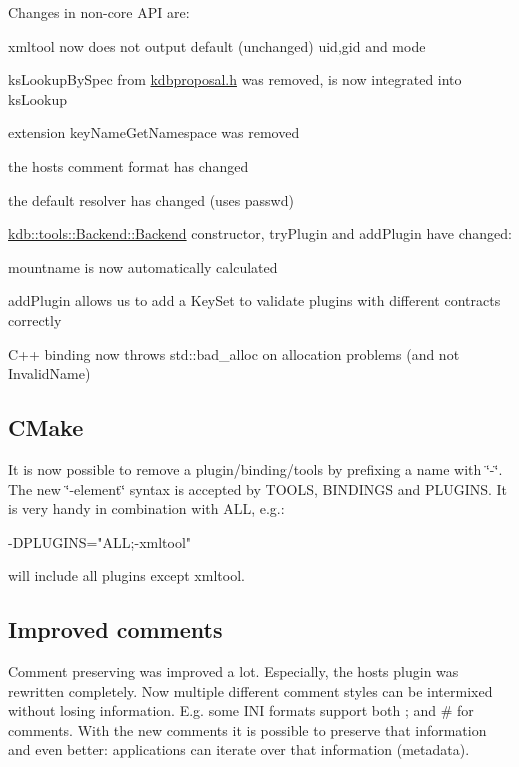 Changes in non-\/core A\+PI are\+:


\begin{DoxyItemize}
\item xmltool now does not output default (unchanged) uid,gid and mode
\item ks\+Lookup\+By\+Spec from \hyperlink{kdbproposal_8h}{kdbproposal.\+h} was removed, is now integrated into ks\+Lookup
\item extension key\+Name\+Get\+Namespace was removed
\item the hosts comment format has changed
\item the default resolver has changed (uses passwd)
\item \hyperlink{classkdb_1_1tools_1_1Backend_a1650b149ebf313ee8cd3472247212263}{kdb\+::tools\+::\+Backend\+::\+Backend} constructor, try\+Plugin and add\+Plugin have changed\+:
\item mountname is now automatically calculated
\item add\+Plugin allows us to add a Key\+Set to validate plugins with different contracts correctly
\item C++ binding now throws std\+::bad\+\_\+alloc on allocation problems (and not Invalid\+Name)
\end{DoxyItemize}

\subsection*{C\+Make}

It is now possible to remove a plugin/binding/tools by prefixing a name with \char`\"{}-\/\char`\"{}. The new \char`\"{}-\/element\char`\"{} syntax is accepted by T\+O\+O\+LS, B\+I\+N\+D\+I\+N\+GS and P\+L\+U\+G\+I\+NS. It is very handy in combination with A\+LL, e.\+g.\+: \begin{DoxyVerb}-DPLUGINS="ALL;-xmltool"
\end{DoxyVerb}


will include all plugins except xmltool.

\subsection*{Improved comments}

Comment preserving was improved a lot. Especially, the hosts plugin was rewritten completely. Now multiple different comment styles can be intermixed without losing information. E.\+g. some I\+NI formats support both ; and \# for comments. With the new comments it is possible to preserve that information and even better\+: applications can iterate over that information (metadata).

